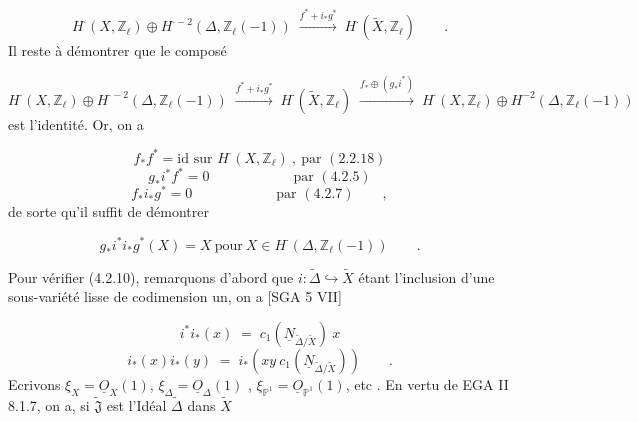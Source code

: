 \begin{equation}\tag{4.2.8}
H^{\cdot}(X,\mathbb{Z}_\ell) \oplus H^{\cdot-2}(\Delta,\mathbb{Z}_\ell(-1)) \;\stackrel{f^*+i_*g^*}{\longrightarrow}\; H^{\cdot}(\widetilde{X},\mathbb{Z}_\ell) \qquad .
\end{equation}
Il reste à démontrer que le composé

\begin{equation}\tag{4.2.9}
H^{\cdot}(X,\mathbb{Z}_\ell) \oplus H^{\cdot-2}(\Delta,\mathbb{Z}_\ell(-1)) \;\stackrel{f^*+i_*g^*}{\longrightarrow}\; H^{\cdot}(\widetilde{X},\mathbb{Z}_\ell) \;\stackrel{f_*\oplus(g_*i^*)}{\longrightarrow}\; H^{\cdot}(X,\mathbb{Z}_\ell)\oplus H^{-2}(\Delta,\mathbb{Z}_\ell(-1))
\end{equation}
est l'identité. Or, on a

\begin{equation*}
f_*f^* = \text{id sur } H^{\cdot}(X,\mathbb{Z}_\ell) \ , \ \text{par } (2.2.18)
\end{equation*}
\begin{equation*}
g_*i^*f^* = 0 \qquad\qquad\qquad \text{par } (4.2.5)
\end{equation*}
\begin{equation*}
f_*i_*g^* = 0 \qquad\qquad\qquad \text{par } (4.2.7) \qquad ,
\end{equation*}
de sorte qu'il suffit de démontrer

\begin{equation}\tag{4.2.10}
g_*i^*i_*g^*(X) = X \ \text{pour} \ X \in H^{\cdot}(\Delta,\mathbb{Z}_\ell(-1)) \qquad .
\end{equation}


Pour vérifier (4.2.10), remarquons d'abord que $i : \widetilde{\Delta} \hookrightarrow \widetilde{X}$ étant l'inclusion d'une sous-variété lisse de codimension un, on a [SGA 5 VII]

\begin{equation}\tag{4.2.11}
i^*i_*(x) \;=\; c_1(\underline{N}_{\widetilde{\Delta}/\widetilde{X}}) \ x
\end{equation}
\begin{equation}\tag{4.2.12}
i_*(x)i_*(y) \;=\; i_*(xy \ c_1(\underline{N}_{\widetilde{\Delta}/\widetilde{X}})) \qquad .
\end{equation}
Ecrivons $\xi_X = \underline{O}_X(1)$, $\xi_\Delta = \underline{O}_\Delta(1)$ , $\xi_{\mathbb{P}^1} = \underline{O}_{\mathbb{P}^1}(1)$, etc . En vertu de EGA II 8.1.7, on a, si $\widetilde{\mathfrak{J}}$ est l'Idéal $\widetilde{\Delta}$ dans $\widetilde{X}$

